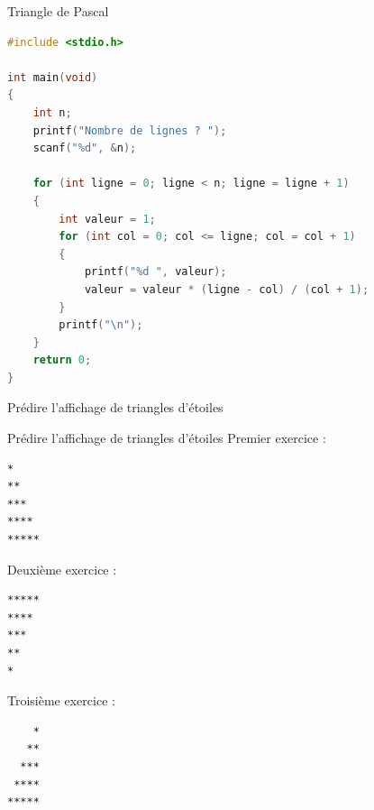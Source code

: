 \begin{UPSTIprofOnlyEnv}
    \begin{UPSTIcorrectionP}{Triangle de Pascal}
        \begin{lstlisting}[language=C]
#include <stdio.h>

int main(void)
{
    int n;
    printf("Nombre de lignes ? ");
    scanf("%d", &n);

    for (int ligne = 0; ligne < n; ligne = ligne + 1)
    {
        int valeur = 1;
        for (int col = 0; col <= ligne; col = col + 1)
        {
            printf("%d ", valeur);
            valeur = valeur * (ligne - col) / (col + 1);
        }
        printf("\n");
    }
    return 0;
}
        \end{lstlisting}
    \end{UPSTIcorrectionP}
\end{UPSTIprofOnlyEnv}


\begin{UPSTIexercice}{Prédire l'affichage de triangles d'étoiles}
\end{UPSTIexercice}

\begin{UPSTIprofOnlyEnv}
    \begin{UPSTIcorrectionP}{Prédire l'affichage de triangles d'étoiles}
        Premier exercice :
        \begin{verbatim}
*
**
***
****
*****
        \end{verbatim}
        Deuxième exercice :
        \begin{verbatim}
*****
****
***
**
*
        \end{verbatim}
        Troisième exercice :
        \begin{verbatim}
    *
   **
  ***
 ****
*****
        \end{verbatim}
    \end{UPSTIcorrectionP}
\end{UPSTIprofOnlyEnv}



